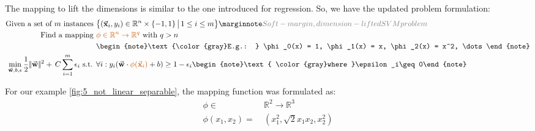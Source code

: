 The mapping to lift the dimensions is similar to the one introduced for regression. So, we have the updated problem formulation:
\begin{align*}\begin{aligned}
  \text{Given a set of } m \text{ instances }& \big\{ (\cv{x}_i, y_i) \in \mathbb{R}^n\times\{-1,1\} \,\big|\, 1\leq i\leq m \big\}\sidenote{Soft-margin, dimension-lifted SVM problem}\\
  \text{Find a mapping }& {\color{burntorange} \phi\in\mathbb{R}^n \rightarrow \mathbb{R}^q }\text{ with } q>n\\
  &\begin{note}\text{\color{gray}E.g.: } \phi_0(x) = 1, \phi_1(x) = x, \phi_2(x) = x^2, \dots\end{note}\\
  \min_{\cv{w}, b, \epsilon}\frac{1}{2}\norm{\cv{w}}^2 +\, C\sum_{i=1}^m\epsilon_i \text{ s.t. } &\forall i: y_i(\cv{w}\cdot{\color{burntorange}\phi(\cv{x}_i)} + b) \geq 1 -\epsilon_i \begin{note}\text{ \color{gray}where }\epsilon_i\geq0\end{note}
\end{aligned}\end{align*}

For our example \ref{fig:5_not_linear_separable}, the mapping function was formulated as:
\begin{align*}
  \phi\in \ & \mathbb{R}^2 \rightarrow \mathbb{R}^3\\
  \phi(x_1, x_2)=\ &\left(x_1^2, \sqrt{2}x_1x_2, x_2^2\right)
\end{align*}

